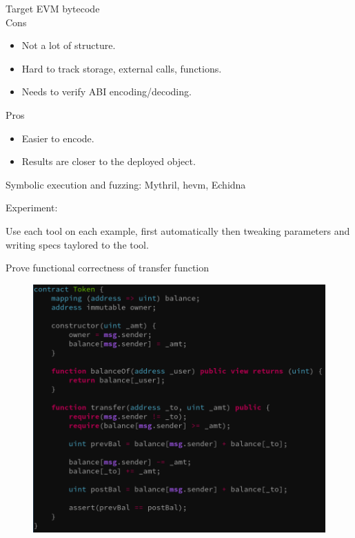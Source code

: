 \documentclass[aspectratio=169,10pt]{beamer}
\begin{document}
\begin{frame}[fragile]
Target EVM bytecode\\
Cons
\begin{itemize}
\item Not a lot of structure.
\item Hard to track storage, external calls, functions.
\item Needs to verify ABI encoding/decoding.
\end{itemize}
Pros\\
\begin{itemize}
\item Easier to encode.
\item Results are closer to the deployed object.
\end{itemize}
Symbolic execution and fuzzing: Mythril, hevm, Echidna
\end{frame}

\begin{frame}[fragile]
Experiment:
\begin{center}
Use each tool on each example, first automatically then tweaking parameters and writing specs taylored to the tool.
\end{center}
\end{frame}

\begin{frame}[fragile]
\begin{center}
Prove functional correctness of transfer function
\begin{figure}
	\includegraphics[scale=0.25]{images/token_pass}
\end{figure}
\end{center}
\end{frame}
\end{document}
